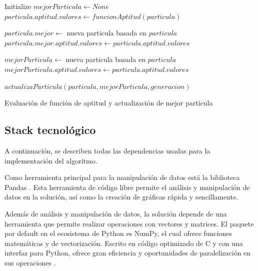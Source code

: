 \documentclass[letterpaper]{report}
\begin{document}
    \begin{algorithm}[ht!]
      \begin{algorithmic}
        \State Initialize $mejorParticula \gets None$
            \State $particula.aptitud.valores \gets funcionAptitud(particula)$

              \State $particula.mejor \gets$ nueva particula basada en $particula$
              \State $particula.mejor.aptitud.valores \gets particula.aptitud.valores$
            \EndIf

              \State $mejorParticula \gets$ nueva particula basada en $particula$
              \State $mejorParticula.aptitud.valores \gets particula.aptitud.valores$
            \EndIf
          \EndFor 

            \State $actualizaParticula(particula, mejorParticula, generacion)$
          \EndFor
        \EndFor
        \caption{Evaluación de función de aptitud y actualización de mejor
          partícula}
        \label{alg:pso-variant-eval}
      \end{algorithmic}
    \end{algorithm}

    \subsection{Stack tecnológico}
    A continuación, se describen todas las dependencias usadas para la
    implementación del algoritmo.

    Como herramienta principal para la manipulación de datos está la biblioteca
    Pandas \cite{PandasDocs}. Esta herramienta de código libre permite el
    análisis y manipulación de datos en la solución, así como la creación de
    gráficas rápida y sencillamente.

    Además de análisis y manipulación de datos, la solución depende de una
    herramienta que permite realizar operaciones con vectores y matrices. El
    paquete por default en el ecosistema de Python es NumPy, el cual ofrece
    funciones matemáticas y de vectorización. Escrito en código optimizado de C
    y con una interfaz para Python, ofrece gran eficiencia y oportunidades de 
    paralelización en sus operaciones \cite{NumPyDocs}.
\end{document}
